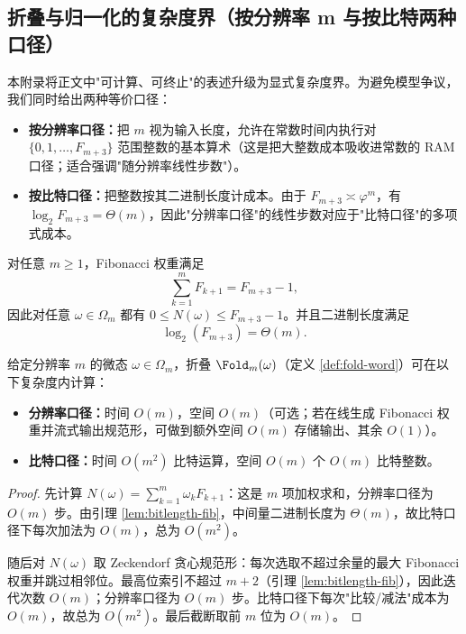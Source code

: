 \subsection{折叠与归一化的复杂度界（按分辨率 m 与按比特两种口径）}

本附录将正文中"可计算、可终止"的表述升级为显式复杂度界。为避免模型争议，我们同时给出两种等价口径：
\begin{itemize}
  \item \textbf{按分辨率口径：}把 $m$ 视为输入长度，允许在常数时间内执行对 $\{0,1,\dots,F_{m+3}\}$ 范围整数的基本算术（这是把大整数成本吸收进常数的 RAM 口径；适合强调"随分辨率线性步数"）。
  \item \textbf{按比特口径：}把整数按其二进制长度计成本。由于 $F_{m+3}\asymp \varphi^{m}$，有 $\log_2 F_{m+3}=\Theta(m)$，因此"分辨率口径"的线性步数对应于"比特口径"的多项式成本。
\end{itemize}

\begin{lemma}[权重与数值大小]\label{lem:bitlength-fib}
对任意 $m\ge 1$，Fibonacci 权重满足
\[
\sum_{k=1}^m F_{k+1}=F_{m+3}-1,
\]
因此对任意 $\omega\in\Omega_m$ 都有 $0\le N(\omega)\le F_{m+3}-1$。并且二进制长度满足
\[
\log_2(F_{m+3})=\Theta(m).
\]
\end{lemma}

\begin{proposition}\label{prop:fold-complexity}
给定分辨率 $m$ 的微态 $\omega\in\Omega_m$，折叠 $\Fold_m(\omega)$（定义 \ref{def:fold-word}）可在以下复杂度内计算：
\begin{itemize}
  \item \textbf{分辨率口径：}时间 $O(m)$，空间 $O(m)$（可选；若在线生成 Fibonacci 权重并流式输出规范形，可做到额外空间 $O(m)$ 存储输出、其余 $O(1)$）。
  \item \textbf{比特口径：}时间 $O(m^2)$ 比特运算，空间 $O(m)$ 个 $O(m)$ 比特整数。
\end{itemize}
\end{proposition}

\begin{proof}
先计算 $N(\omega)=\sum_{k=1}^m \omega_k F_{k+1}$：这是 $m$ 项加权求和，分辨率口径为 $O(m)$ 步。由引理 \ref{lem:bitlength-fib}，中间量二进制长度为 $\Theta(m)$，故比特口径下每次加法为 $O(m)$，总为 $O(m^2)$。

随后对 $N(\omega)$ 取 Zeckendorf 贪心规范形：每次选取不超过余量的最大 Fibonacci 权重并跳过相邻位。最高位索引不超过 $m+2$（引理 \ref{lem:bitlength-fib}），因此迭代次数 $O(m)$；分辨率口径为 $O(m)$ 步。比特口径下每次"比较/减法"成本为 $O(m)$，故总为 $O(m^2)$。最后截断取前 $m$ 位为 $O(m)$。
\end{proof}

